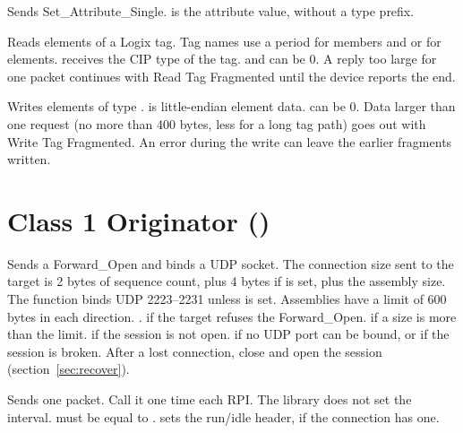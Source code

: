 Sends Set\_Attribute\_Single.  is the attribute value, without a
type prefix.

Reads  elements of a Logix tag. Tag names use a period for
members and \code{[n]} or \code{[n,m]} for elements. 
receives the CIP type of the tag.  and  can
be 0. A reply too large for one packet continues with Read Tag Fragmented
until the device reports the end.

Writes  elements of type .  is
little-endian element data.  can be 0. Data larger than one
request (no more than 400 bytes, less for a long tag path) goes out with
Write Tag Fragmented. An error during the write can leave the earlier
fragments written.

\section{Class 1 Originator ()}

Sends a Forward\_Open and binds a UDP socket. The connection size sent to the
target is 2 bytes of sequence count, plus 4 bytes if  is set,
plus the assembly size. The function binds UDP 2223--2231 unless
 is set. Assemblies have a limit of 600 bytes in each
direction.
\ret {}.  if the target refuses the
Forward\_Open.  if a size is more than the limit.
 if the session is not open.  if no UDP
port can be bound, or if the session is broken. After a lost connection,
close and open the session (section~\ref{sec:recover}).

Sends one \OT{} packet. Call it one time each RPI. The library does not set
the interval.  must be equal to .
 sets the run/idle header, if the connection has one.

